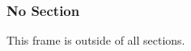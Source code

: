 \begin{frame}
    \frametitle{No Section}

    \begin{block}{This frame is outside of all sections.}
    \end{block}
\end{frame}


